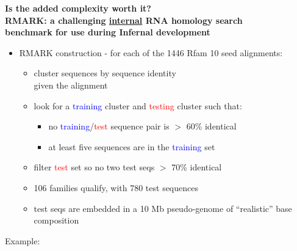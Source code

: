 \documentclass[landscape]{slides}
\begin{document}
\begin{slide}
\begin{center}
\textbf{Is the added complexity worth it? \\
  RMARK: a challenging \underline{internal} RNA homology search \\
  benchmark for use during Infernal development}
\end{center}
\medskip
\begin{minipage}{7in}
\small
\begin{itemize}
\item
  RMARK construction - for each of the 1446 Rfam 10 seed alignments:
  \begin{itemize}
  \item 
    cluster sequences by sequence identity \\ given the alignment
  \item 
    look for a \textcolor{blue}{training} cluster and
    \textcolor{red}{testing} cluster such that: 
    \begin{itemize}
    \item
      no \textcolor{blue}{training}/\textcolor{red}{test} sequence pair is $>$ 60\% identical
    \item
      at least five sequences are in the \textcolor{blue}{training} set
    \end{itemize}
  \item
    filter \textcolor{red}{test} set so no two test seqs $>$ 70\% identical 
  \item
    106 families qualify, with 780 test sequences
  \item
    test seqs are embedded in a 10 Mb pseudo-genome of ``realistic'' base composition
  \end{itemize}
\end{itemize}
\vspace{1.5in}
\end{minipage}
\hspace{0.1in}
\begin{minipage}{3.5in}
  Example: 
\vspace{0.2in}


\end{minipage}
\end{slide}
\end{document}
